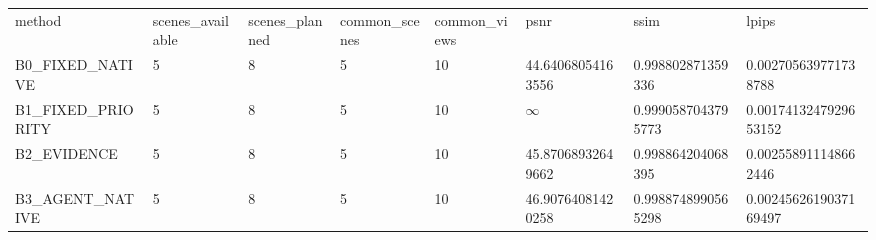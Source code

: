 \begin{tabular}{llllllll}
method & scenes\_available & scenes\_planned & common\_scenes & common\_views & psnr & ssim & lpips \\
B0\_FIXED\_NATIVE & 5 & 8 & 5 & 10 & 44.64068054163556 & 0.998802871359336 & 0.002705639771738788 \\
B1\_FIXED\_PRIORITY & 5 & 8 & 5 & 10 & $\infty$ & 0.9990587043795773 & 0.0017413247929653152 \\
B2\_EVIDENCE & 5 & 8 & 5 & 10 & 45.87068932649662 & 0.998864204068395 & 0.002558911148662446 \\
B3\_AGENT\_NATIVE & 5 & 8 & 5 & 10 & 46.90764081420258 & 0.9988748990565298 & 0.0024562619037169497 \\
\end{tabular}
